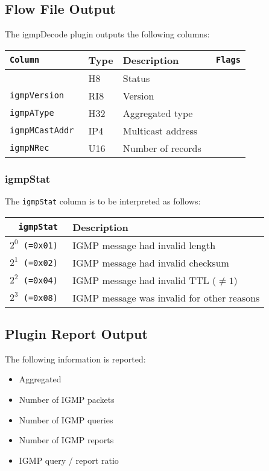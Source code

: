 \documentclass[documentation]{subfiles}
\begin{document}
\subsection{Flow File Output}
The igmpDecode plugin outputs the following columns:
\begin{longtable}{>{\tt}lll>{\tt\small}l}
    \toprule
    {\bf Column} & {\bf Type} & {\bf Description} & {\bf Flags}\\
    \midrule\endhead%
    \nameref{igmpStat} & H8  & Status\\
    igmpVersion       & RI8 & Version\\
    igmpAType         & H32 & Aggregated type \\%
    igmpMCastAddr     & IP4 & Multicast address\\
    igmpNRec          & U16 & Number of records\\
    \bottomrule
\end{longtable}

\subsubsection{igmpStat}\label{igmpStat}
The {\tt igmpStat} column is to be interpreted as follows:
\begin{longtable}{>{\tt}rl}
    \toprule
    {\bf igmpStat} & {\bf Description} \\
    \midrule\endhead%
    $2^0$ (=0x01) & IGMP message had invalid length\\
    $2^1$ (=0x02) & IGMP message had invalid checksum\\
    $2^2$ (=0x04) & IGMP message had invalid TTL ($\neq1$)\\
    $2^3$ (=0x08) & IGMP message was invalid for other reasons\\
    \bottomrule
\end{longtable}

\subsection{Plugin Report Output}
The following information is reported:
\begin{itemize}
    \item Aggregated {\tt{}}
    \item Number of IGMP packets
    \item Number of IGMP queries
    \item Number of IGMP reports
    \item IGMP query / report ratio
\end{itemize}
\end{document}
